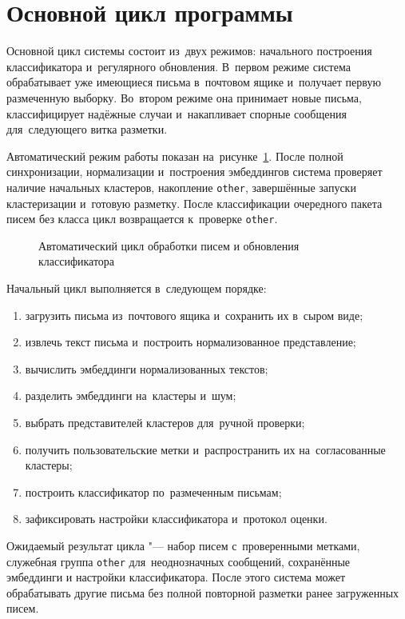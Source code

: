 \section{Основной цикл программы}\label{sec:ch2/pipeline}

Основной цикл системы состоит из~двух режимов: начального построения
классификатора и~регулярного обновления. В~первом режиме система обрабатывает
уже имеющиеся письма в~почтовом ящике и~получает первую размеченную выборку.
Во~втором режиме она принимает новые письма, классифицирует надёжные случаи
и~накапливает спорные сообщения для~следующего витка разметки.

Автоматический режим работы показан на~рисунке~\ref{fig:ch2/pipeline}. После
полной синхронизации, нормализации и~построения эмбеддингов система проверяет
наличие начальных кластеров, накопление \texttt{other}, завершённые запуски
кластеризации и~готовую разметку. После классификации очередного пакета писем
без класса цикл возвращается к~проверке \texttt{other}.

\begin{figure}[htbp]
    \centering
    \resizebox{\textwidth}{!}{%
    }
    \caption{Автоматический цикл обработки писем и обновления классификатора}\label{fig:ch2/pipeline}
\end{figure}
\FloatBarrier

Начальный цикл выполняется в~следующем порядке:

\begin{enumerate}
    \item загрузить письма из~почтового ящика и~сохранить их в~сыром виде;
    \item извлечь текст письма и~построить нормализованное представление;
    \item вычислить эмбеддинги нормализованных текстов;
    \item разделить эмбеддинги на~кластеры и~шум;
    \item выбрать представителей кластеров для~ручной проверки;
    \item получить пользовательские метки и~распространить их на~согласованные
        кластеры;
    \item построить классификатор по~размеченным письмам;
    \item зафиксировать настройки классификатора и~протокол оценки.
\end{enumerate}

Ожидаемый результат цикла "--- набор писем с~проверенными метками, служебная
группа \texttt{other} для~неоднозначных сообщений, сохранённые эмбеддинги и
настройки классификатора. После этого система может обрабатывать другие письма без
полной повторной разметки ранее загруженных писем.

